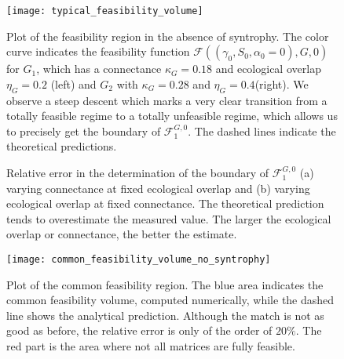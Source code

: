\documentclass[12pt, titlepage]{report}
\begin{document}
\begin{figure}[h!]
\centering
\texttt{[image: typical\_feasibility\_volume]}
\caption{Plot of the feasibility region in the absence of syntrophy. The color curve indicates the feasibility function $\mathcal{F}\left((\gamma_0, S_0, \alpha_0=0), G, 0\right)$ for $G_1$, which has a connectance $\kappa_{G}=0.18$ and ecological overlap $\eta_{G}=0.2$ (left) and $G_2$ with $\kappa_G=0.28$ and $\eta_G=0.4$(right). We observe a steep descent which marks a very clear transition from a totally feasible regime to a totally unfeasible regime, which allows us to precisely get the boundary of $\mathcal{F}^{G, 0}_1$. The dashed lines indicate the theoretical predictions.}
\label{fig: typical feasibility region}
\end{figure}
\begin{figure}[h!]
	\captionsetup[subfigure]{captionskip = -165pt, margin = 45pt}
\captionsetup[subfigure]{captionskip = -175pt, margin = 45pt}
\caption{Relative error in the determination of the boundary of $\mathcal{F}^{G,0}_1$ (a) varying connectance at fixed ecological overlap and (b) varying ecological overlap at fixed connectance. The theoretical prediction tends to overestimate the measured value. The larger the ecological overlap or connectance, the better the estimate.}\label{fig: deviation away from theory feasibility}
\end{figure}
\begin{figure}[h!]
\centering
\texttt{[image: common\_feasibility\_volume\_no\_syntrophy]}
\caption{Plot of the common feasibility region. The blue area indicates the common feasibility volume, computed numerically, while the dashed line shows the analytical prediction. Although the match is not as good as before, the relative error is only of the order of $20 \%$. The red part is the area where not all matrices are fully feasible.}
\label{fig: common feasible volume no syntrophy}
\end{figure}
\end{document}
